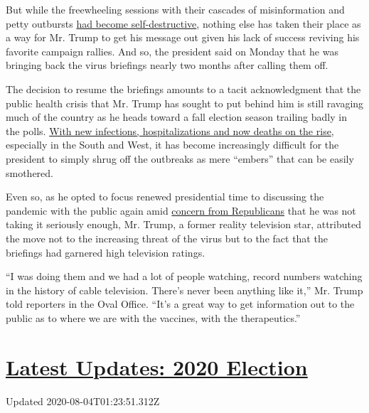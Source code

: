 But while the freewheeling sessions with their cascades of
misinformation and petty outbursts
\href{https://www.nytimes.com/2020/04/09/us/politics/trump-coronavirus-press-briefing.html}{had
become self-destructive}, nothing else has taken their place as a way
for Mr. Trump to get his message out given his lack of success reviving
his favorite campaign rallies. And so, the president said on Monday that
he was bringing back the virus briefings nearly two months after calling
them off.

The decision to resume the briefings amounts to a tacit acknowledgment
that the public health crisis that Mr. Trump has sought to put behind
him is still ravaging much of the country as he heads toward a fall
election season trailing badly in the polls.
\href{https://www.nytimes.com/interactive/2020/us/coronavirus-us-cases.html}{With
new infections, hospitalizations and now deaths on the rise}, especially
in the South and West, it has become increasingly difficult for the
president to simply shrug off the outbreaks as mere ``embers'' that can
be easily smothered.

Even so, as he opted to focus renewed presidential time to discussing
the pandemic with the public again amid
\href{https://www.nytimes.com/2020/07/19/us/politics/republicans-contradict-trump-coronavirus.html}{concern
from Republicans} that he was not taking it seriously enough, Mr. Trump,
a former reality television star, attributed the move not to the
increasing threat of the virus but to the fact that the briefings had
garnered high television ratings.

``I was doing them and we had a lot of people watching, record numbers
watching in the history of cable television. There's never been anything
like it,'' Mr. Trump told reporters in the Oval Office. ``It's a great
way to get information out to the public as to where we are with the
vaccines, with the therapeutics.''

\hypertarget{latest-updates-2020-election}{%
\section{\texorpdfstring{\href{https://www.nytimes.com/2020/08/03/us/elections/biden-vs-trump.html?action=click\&pgtype=Article\&state=default\&region=MAIN_CONTENT_1\&context=storylines_live_updates}{Latest
Updates: 2020
Election}}{Latest Updates: 2020 Election}}\label{latest-updates-2020-election}}

Updated 2020-08-04T01:23:51.312Z


